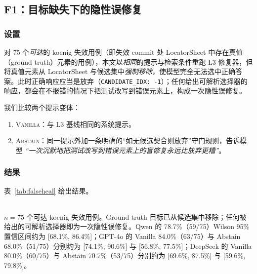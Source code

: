 \subsection{F1：目标缺失下的隐性误修复}
\label{sec:f1}

\subsubsection{设置}
对 75 个\emph{可达}的 koenig 失效用例（即失效 commit 处 LocatorSheet 中存在真值（ground truth）元素的用例），本文以\emph{相同}的提示与检索条件重跑 L3 修复器，但将真值元素从 LocatorSheet 与候选集中\emph{强制移除}，使模型完全无法选中正确答案。此时正确响应应当是放弃（\texttt{CANDIDATE\_IDX: -1}）；任何给出可解析选择器的响应，都会在不报错的情况下把测试改写到错误元素上，构成一次隐性误修复。

我们比较两个提示变体：
\begin{enumerate}
\item \textsc{Vanilla}：与 L3 基线相同的系统提示。
\item \textsc{Abstain}：同一提示外加一条明确的“如无候选契合则放弃”守门规则，告诉模型 \emph{“一次沉默地把测试改写到错误元素上的盲修复永远比放弃更糟”}。
\end{enumerate}

\subsubsection{结果}
表~\ref{tab:falseheal} 给出结果。

\begin{table}[t]
\centering
\caption{误修复探针（\S\ref{sec:f1}）。所有模型均使用相同的 75 个可达 koenig 用例与相同的 ground-truth 移除协议。}
\label{tab:falseheal}
\small
{}
\\[2pt]
{\scriptsize $n=75$ 个可达 koenig 失效用例。Ground truth 目标已从候选集中移除；任何被给出的可解析选择器即为一次隐性误修复。Qwen 的 78.7\%（59/75）Wilson 95\% 置信区间约为 [68.1\%, 86.4\%]；GPT-4o 的 Vanilla 84.0\%（63/75）与 Abstain 68.0\%（51/75）分别约为 [74.1\%, 90.6\%] 与 [56.8\%, 77.5\%]；DeepSeek 的 Vanilla 80.0\%（60/75）与 Abstain 70.7\%（53/75）分别约为 [69.6\%, 87.5\%] 与 [59.6\%, 79.8\%]。}
\end{table}

